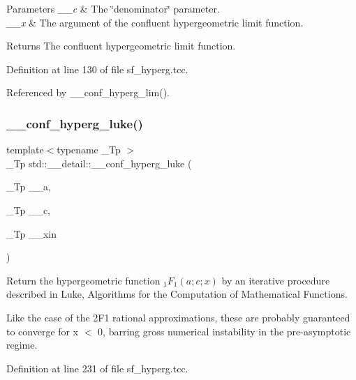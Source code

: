 \begin{DoxyParams}{Parameters}
{\em \+\_\+\+\_\+c} & The \char`\"{}denominator\char`\"{} parameter. \\
\hline
{\em \+\_\+\+\_\+x} & The argument of the confluent hypergeometric limit function. \\
\hline
\end{DoxyParams}
\begin{DoxyReturn}{Returns}
The confluent hypergeometric limit function. 
\end{DoxyReturn}


Definition at line 130 of file sf\+\_\+hyperg.\+tcc.



Referenced by \+\_\+\+\_\+conf\+\_\+hyperg\+\_\+lim().

\mbox{\label{namespacestd_1_1____detail_ac3b4c72998f9d7deb6d79bda93220e58}} 
\subsubsection{\texorpdfstring{\+\_\+\+\_\+conf\+\_\+hyperg\+\_\+luke()}{\_\_conf\_hyperg\_luke()}}
{\footnotesize\ttfamily template$<$typename \+\_\+\+Tp $>$ \\
\+\_\+\+Tp std\+::\+\_\+\+\_\+detail\+::\+\_\+\+\_\+conf\+\_\+hyperg\+\_\+luke (\begin{DoxyParamCaption}\item[{\+\_\+\+Tp}]{\+\_\+\+\_\+a,  }\item[{\+\_\+\+Tp}]{\+\_\+\+\_\+c,  }\item[{\+\_\+\+Tp}]{\+\_\+\+\_\+xin }\end{DoxyParamCaption})}



Return the hypergeometric function $ {}_1F_1(a;c;x) $ by an iterative procedure described in Luke, Algorithms for the Computation of Mathematical Functions. 

Like the case of the 2\+F1 rational approximations, these are probably guaranteed to converge for x $<$ 0, barring gross numerical instability in the pre-\/asymptotic regime. 

Definition at line 231 of file sf\+\_\+hyperg.\+tcc.




